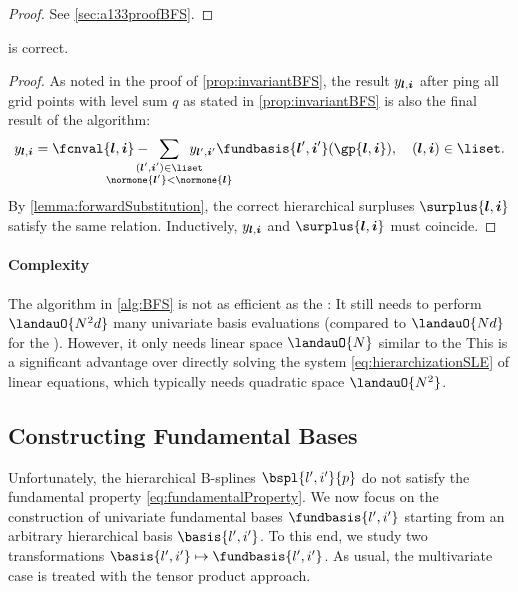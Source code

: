 \begin{proof}
  See \cref{sec:a133proofBFS}.
\end{proof}

\begin{shortcorollary}
  \label{cor:algBFSCorrectness}
   is correct.
\end{shortcorollary}

\begin{proof}
  As noted in the proof of \cref{prop:invariantBFS},
  the result $\linout{\*l,\*i}$ after \pop{}ping all grid points with level sum
  $q$ as stated in \cref{prop:invariantBFS} is also the final result
  of the algorithm:
  \begin{equation}
    \linout{\*l,\*i}
    = \fcnval{\*l,\*i} -
    \largesum{\substack{(\*l',\*i')\in\liset\\\normone{\*l'} < \normone{\*l}}}
    \linout{\*l',\*i'} \fundbasis{\*l',\*i'}(\gp{\*l,\*i}),\quad
    (\*l, \*i) \in \liset.
  \end{equation}
  By \cref{lemma:forwardSubstitution},
  the correct hierarchical surpluses $\surplus{\*l,\*i}$
  satisfy the same relation.
  Inductively, $\linout{\*l,\*i}$ and $\surplus{\*l,\*i}$ must coincide.
\end{proof}

\paragraph{Complexity}

The \bfs algorithm in \cref{alg:BFS} is not as efficient as the \up:
It still needs to perform $\landauO{N^2 d}$ many univariate
basis evaluations (compared to $\landauO{Nd}$ for the \up).
However, it only needs linear space $\landauO{N}$ similar to the
\up{}
This is a significant advantage over directly solving the system
\eqref{eq:hierarchizationSLE} of linear equations, which typically
needs quadratic space $\landauO{N^2}$.



\subsection{Constructing Fundamental Bases}
\label{sec:442constructingFundamentalBases}

Unfortunately, the hierarchical B-splines $\bspl{l',i'}{p}$ do not
satisfy the fundamental property \eqref{eq:fundamentalProperty}.
We now focus on the construction of univariate fundamental bases
$\fundbasis{l',i'}$ starting from an
arbitrary hierarchical basis $\basis{l',i'}$.
To this end, we study two transformations
$\basis{l',i'} \mapsto \fundbasis{l',i'}$.
As usual, the multivariate case is treated with the
tensor product approach.

